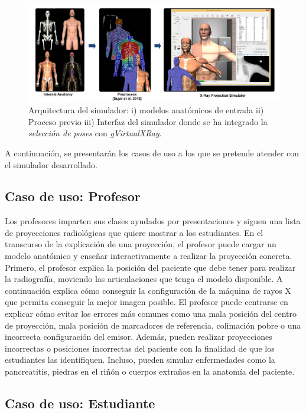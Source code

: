 \begin{figure}[h]
\centering
\includegraphics[width=\linewidth]{IMG/summary.png}

\caption{\label{fig:Posesummary} Arquitectura del simulador: i) modelos anatómicos de entrada ii) Proceso previo iii) Interfaz del simulador donde se ha integrado la \emph{selección de poses} con \emph{gVirtualXRay}.
}
\end{figure}

A continuación, se presentarán los casos de uso a los que se pretende atender con el simulador desarrollado.



\subsection{Caso de uso: Profesor}
\label{xray:casodeuso}
Los profesores imparten sus clases ayudados por presentaciones y siguen una lista de proyecciones radiológicas que quiere mostrar a los estudiantes. En el transcurso de la explicación de una proyección, el profesor puede cargar un modelo anatómico y enseñar interactivamente a realizar la proyección concreta.  Primero, el profesor explica la posición del paciente que debe tener para realizar la radiografía, moviendo las articulaciones que tenga el modelo disponible. A continuación explica cómo conseguir la configuración de la máquina de rayos X que permita conseguir la mejor imagen posible. El profesor puede centrarse en explicar cómo evitar los errores más comunes como una mala posición del centro de proyección, mala posición de marcadores de referencia, colimación pobre o una incorrecta configuración del emisor. Además, pueden realizar proyecciones incorrectas o posiciones incorrectas del paciente con la finalidad de que los estudiantes las identifiquen. Incluso, pueden simular enfermedades como la pancreatitis, piedras en el riñón o cuerpos extraños en la anatomía del paciente.


\subsection{Caso de uso: Estudiante}

